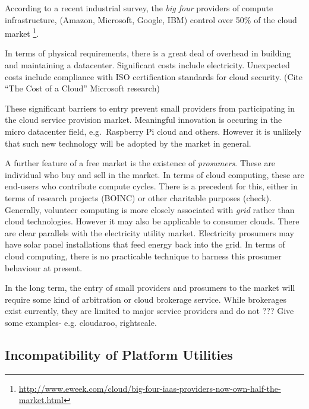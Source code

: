 \documentclass[conference,10pt]{IEEEtran}
\begin{document}
According to a recent industrial survey, the \emph{big four} providers of compute infrastructure, (Amazon, Microsoft, Google, IBM) control over 50\% of the cloud market \footnote{\url{http://www.eweek.com/cloud/big-four-iaas-providers-now-own-half-the-market.html}}.

In terms of physical requirements, there is a great deal of overhead in building and maintaining a datacenter. Significant costs include electricity. Unexpected costs include compliance with ISO certification standards for cloud security. (Cite ``The Cost of a Cloud'' Microsoft research)

These significant barriers to entry prevent small providers from participating in the cloud service provision market. Meaningful innovation is occuring in the micro datacenter field, e.g.\ Raspberry Pi cloud and others.
However it is unlikely that such new technology will be adopted by the market in general.


A further feature of a free market is the existence of \emph{prosumers}. These are individual who buy and sell in the market. In terms of cloud computing, these are end-users who contribute compute cycles. There is a precedent for this, either in terms of research projects (BOINC) or other charitable purposes (check). Generally, volunteer computing is more closely associated with \emph{grid} rather than cloud technologies. However it may also be applicable to consumer clouds. There are clear parallels with the electricity utility market. Electricity prosumers may have solar panel installations that feed energy back into the grid. In terms of cloud computing, there is no practicable technique to harness this prosumer behaviour at present.

In the long term, the entry of small providers and prosumers to the market will require some kind of arbitration or cloud brokerage service. While brokerages exist currently, they are limited to major service providers and do not 
???
Give some examples- e.g. cloudaroo, rightscale.


\subsection{Incompatibility of Platform Utilities}
\end{document}
